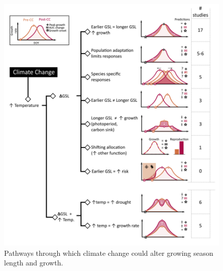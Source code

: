 \documentclass[11pt]{article}
\begin{document}
\clearpage
\begin{figure}[h!]
\includegraphics[width=1\textwidth]{..//figures/hypothesesconceptfig.png}
\caption{Pathways through which climate change could alter growing season length and growth.}
\label{fig:hypotheses}
\end{figure}
\end{document}
